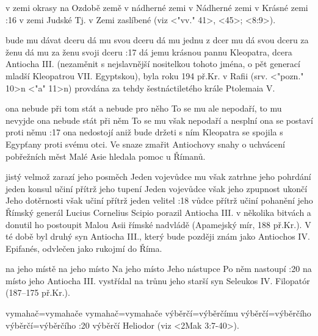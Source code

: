     {v zemi okrasy}   %
    {na Ozdobě země}   %
    {v nádherné zemi}   %
    {v Nádherné zemi}   %
    {v Krásné zemi}   %
:16 {v zemi Judské}
    Tj. v Zemi zaslíbené (viz <"vv." 41>, <45>; <8:9>).

    {bude mu dávat dceru}   %
    {dá mu svou dceru}  %
    {dá mu jednu z dcer}  %
    {mu dá svou dceru za ženu}   %
    {dá mu za ženu svoji dceru}   %
:17 {dá jemu krásnou pannu}
    Kleopatra, dcera Antiocha III. (nezaměnit s nejslavnější nositelkou tohoto jména, o pět generací mladší Kleopatrou VII. Egyptskou), byla roku 194 př.Kr. v Rafii (srv. <"pozn." 10>n <"a" 11>n) provdána za tehdy šestnáctiletého krále Ptolemaia V. 
    
    {ona nebude při tom stát a nebude pro něho}   %
    {To se mu ale nepodaří, to mu nevyjde}   %
    {ona nebude stát při něm}   %
    {To se mu však nepodaří a nesplní}   %
    {ona se postaví proti němu}   %
:17 {ona nedostojí aniž bude držeti s ním}
   Kleopatra se spojila s Egypťany proti svému otci. Ve snaze zmařit Antiochovy snahy o uchvácení pobřežních měst Malé Asie hledala pomoc u Římanů.  

    {jistý velmož zarazí jeho posměch}   %
    {Jeden vojevůdce mu však zatrhne jeho pohrdání}   %
    {jeden konsul učiní přítrž jeho tupení}   %
    {Jeden vojevůdce však jeho zpupnost ukončí}   %
    {Jeho dotěrnosti však učiní přítrž jeden velitel}   %
:18 {vůdce přítrž učiní pohanění jeho}  
    Římský generál Lucius Cornelius Scipio porazil Antiocha III. v několika bitvách a donutil ho postoupit Malou Asii římské nadvládě (Apamejský mír, 188 př.Kr.). V té době byl druhý syn Antiocha III., který bude později  znám jako Antiochos IV. Epifanés, odvlečen jako rukojmí do Říma.

    {na jeho místě}   %
    {na jeho místo}   %
    {Na jeho místo}   %
    {Jeho nástupce}   %
    {Po něm nastoupí}   %
:20 {na místo jeho}
    Antiocha III. vystřídal na trůnu jeho starší syn Seleukos IV. Filopatór (187--175 př.Kr.).

    {vymahač}={vymahače}   %
    {vymahač}={vymahače}   %
    {výběrčí}={výběrčímu}   %
    {výběrčí}={výběrčího}   %
    {výběrčí}={výběrčího}   %
:20 {výběrčí}
    Heliodor (viz <2Mak 3:7-40>).
    
